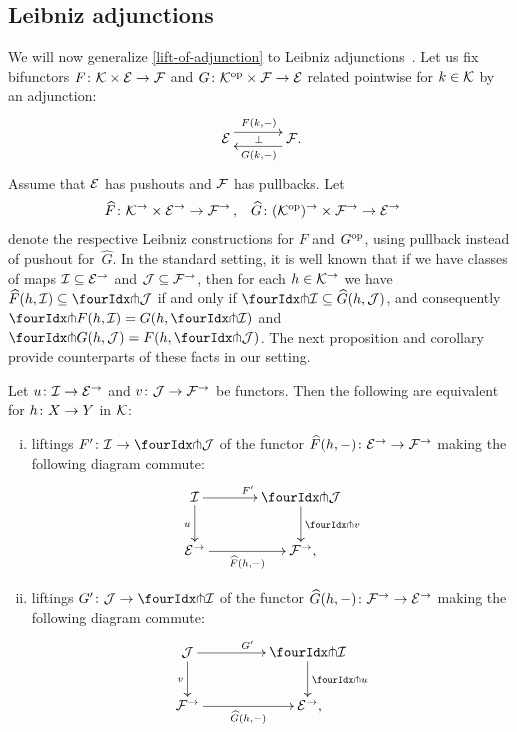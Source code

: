 \documentclass[reqno,10pt,a4paper,oneside]{amsart}
\begin{document}




\subsection*{Leibniz adjunctions}

We will now generalize \cref{lift-of-adjunction} to Leibniz adjunctions~\cite{riehl-verity:reedy}.
Let us fix bifunctors $F \co \cal{K} \times \cal{E} \to \cal{F}$ and $G \co \cal{K}^{\op} \times \cal{F} \to \cal{E}$ related pointwise for $k \in \cal{K}$ by an adjunction:
\[
\xymatrix@C+1em{
  \cal{E}
  \ar@<5pt>[r]^{F(k, \arghole)}
  \ar@{}[r]|{\bot}
&
  \cal{F} \rlap{.}
  \ar@<5pt>[l]^{G(k, \arghole)}
}
\]
Assume that $\cal{E}$ has pushouts and $\cal{F}$ has pullbacks.
Let
\[
\begin{aligned}
  \widehat{F} &\co \cal{K}^\to \times \cal{E}^\to \to \cal{F}^\to
\, ,&
  \widehat{G} &\co (\cal{K}^{\op})^\to \times \cal{F}^\to \to \cal{E}^\to
\end{aligned}
\]
denote the respective Leibniz constructions for $F$ and $G^{\op}$, using pullback instead of pushout for~$\widehat{G}$.
In the standard setting, it is well known that if we have classes of maps $\cal{I} \subseteq \cal{E}^\to$ and $\cal{J} \subseteq \cal{F}^\to$, then for each $h \in \cal{K}^\to$ we have $\widehat{F}(h, \cal{I}) \subseteq \liftl{\cal{J}}$ if and only if $\liftr{\cal{I}} \subseteq \widehat{G}(h, \cal{J})$, and consequently $\liftr{F(h, \cal{I})} = G(h, \liftr{\cal{I}})$ and $\liftl{G(h, \cal{J})} = F(h, \liftl{\cal{J}})$.
The next proposition and corollary provide counterparts of these facts in our setting.

\begin{proposition} \label{lift-of-leibniz-adjunction}
Let $u \co \cal{I} \to \cal{E}^\to$ and $v \co \cal{J} \to \cal{F}^\to$ be functors.
Then the following are equivalent for $h \co X \to Y$ in $\cal{K}$:
\begin{enumerate}[(i)]
\item liftings $F' \co \cal{I} \to \liftl{\cal{J}}$ of the functor $\widehat{F}(h, \arghole) \co \cal{E}^\to \to \cal{F}^\to$ making the following diagram commute:
\[
\xymatrix@C=1.2cm{
  \cal{I}
  \ar[r]^{F'}
  \ar[d]_{u}
&
  \liftl{\cal{J}}
  \ar[d]^{\liftl{v}}
\\
  \cal{E}^\to
  \ar[r]_-{\widehat{F}(h, \arghole)}
&
  \cal{F}^\to
\rlap{,}}
\]
\item liftings $G' \co \cal{J} \to \liftr{\cal{I}}$ of the functor $\widehat{G}(h, \arghole) \co \cal{F}^\to \to \cal{E}^\to$ making the following diagram commute:
\[
\xymatrix@C+2em{
    \cal{J}
      \ar[d]_{v}
      \ar[r]^{G'}
&
  \liftr{\cal{I}}
    \ar[d]^{\liftr{u}}
\\
  \cal{F}^\to
   \ar[r]_-{\widehat{G}(h, \arghole)}
&
  \cal{E}^\to
\rlap{,}}
\]
\end{enumerate}
\end{proposition}
\end{document}
